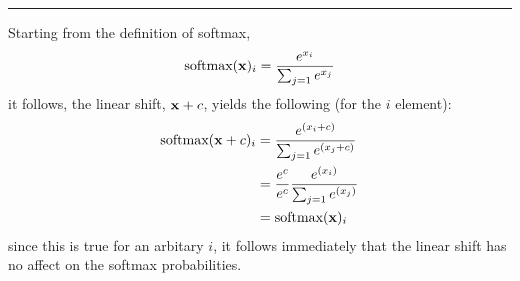 \noindent\rule{\textwidth}{0.4pt}

\noindent Starting from the definition of softmax,
\begin{equation}
\textrm{softmax}({\bf x})_{i} = \frac{e^{x_{i}}}{\sum_{j=1}{e^{x_{j}}}}
\end{equation}
it follows, the linear shift, ${\bf x} + c$, yields the following (for the $i$ element):
\begin{align}
\textrm{softmax}({\bf x} + c)_{i} & = \frac{e^{(x_{i} + c)}}{\sum_{j=1}{e^{(x_{j} + c)}}}\\
                                                 & = \frac{e^{c}}{e^{c}}\frac{e^{(x_{i})}}{\sum_{j=1}{e^{(x_{j})}}}\\
                                                 & = \textrm{softmax}({\bf x})_{i}
\end{align}
since this is true for an arbitary $i$, it follows immediately that the linear shift has no affect on the softmax probabilities.




\clearpage
\pagestyle{myheadings}

